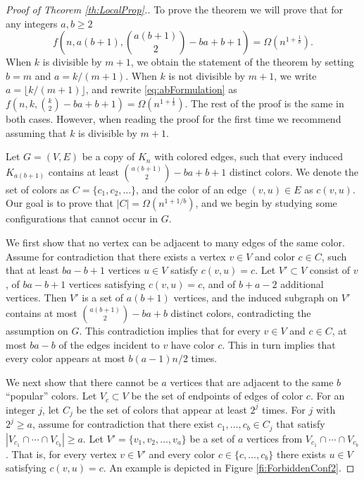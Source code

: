 \documentclass[11pt]{article}
\newcommand{\parag}[1]{\vspace{2mm}

\noindent{\bf #1} }
\begin{document}
\begin{proof}[Proof of Theorem \ref{th:LocalProp}.]
To prove the theorem we will prove that for any integers $a,b \ge 2$
%
\begin{equation} \label{eq:abFormulation}
f\left(n,a(b+1),\binom{a(b+1)}{2} - ba + b+1 \right) = \Omega\left(n^{1+\frac{1}{b}}\right).
\end{equation}
%
When $k$ is divisible by $m+1$, we obtain the statement of the theorem by setting $b=m$ and $a= k/(m+1)$.
When $k$ is not divisible by $m+1$, we write $a= \lfloor k/(m+1) \rfloor$, and rewrite \eqref{eq:abFormulation} as $f\left(n,k,\binom{k}{2} - ba + b+1 \right)= \Omega\left(n^{1+\frac{1}{b}}\right)$.
The rest of the proof is the same in both cases.
However, when reading the proof for the first time we recommend assuming that $k$ is divisible by $m+1$.

Let $G=(V,E)$ be a copy of $K_n$ with colored edges, such that every induced $K_{a(b+1)}$ contains at least  $\binom{a(b+1)}{2} - ba + b+1$ distinct colors.
We denote the set of colors as $C = \{c_1,c_2,\ldots\}$, and the color of an edge $(v,u)\in E$ as $c(v,u)$.
Our goal is to prove that $|C|=\Omega\left(n^{1+1/b}\right)$, and we begin by studying some configurations that cannot occur in $G$.

\parag{Forbidden configurations.}
We first show that no vertex can be adjacent to many edges of the same color.
Assume for contradiction that there exists a vertex $v \in V$ and color $c\in C$, such that at least $ba-b+1$ vertices $u\in V$ satisfy $c(v,u)=c$.
Let $V' \subset V$ consist of $v$, of $ba-b+1$ vertices satisfying $c(v,u)=c$, and of $b+a-2$ additional vertices.
Then $V'$ is a set of $a(b+1)$ vertices, and the induced subgraph on $V'$  contains at most $\binom{a(b+1)}{2} - ba + b$ distinct colors, contradicting the assumption on $G$.
This contradiction implies that for every $v\in V$ and $c\in C$, at most $ba-b$ of the edges incident to $v$ have color $c$.
This in turn implies that every color appears at most $b(a-1)n/2$ times.

We next show that there cannot be $a$ vertices that are adjacent to the same $b$ ``popular'' colors.
Let $V_c \subset V$ be the set of endpoints of edges of color $c$.
For an integer $j$, let $C_j$ be the set of colors that appear at least $2^j$ times.
For $j$ with  $2^j\ge a$, assume for contradiction that there exist $c_1, \ldots, c_b \in C_j$ that satisfy $|V_{c_1} \cap \cdots \cap V_{c_b}| \ge a$.
Let $V' = \{v_1,v_2,\ldots,v_a\}$ be a set of $a$ vertices from $V_{c_1} \cap \cdots \cap V_{c_b}$.
That is, for every vertex $v\in V'$ and every color $c \in \{c,\ldots,c_b\}$ there exists $u\in V$ satisfying $c(v,u)=c$.
An example is depicted in Figure \ref{fi:ForbiddenConf2}.


\end{proof}
\end{document}

